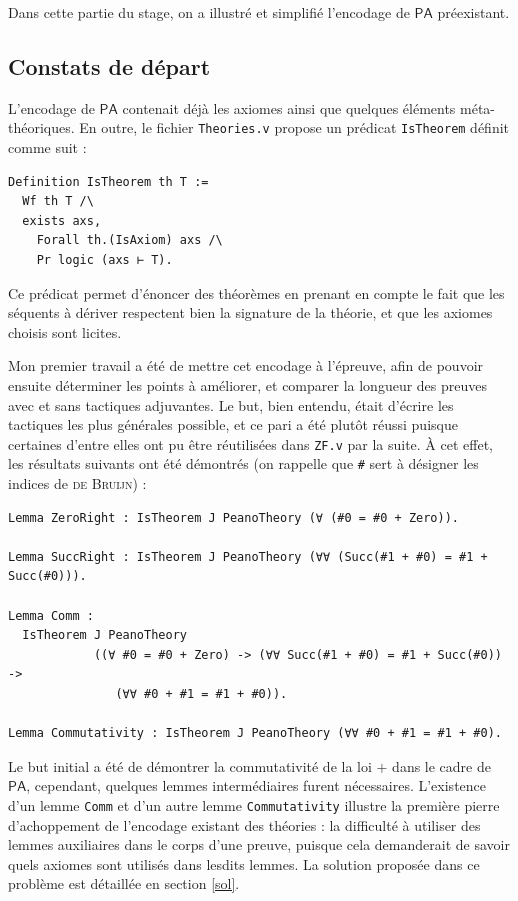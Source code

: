 \documentclass[a4paper]{article}
\newcommand{\PA}{\mathsf{PA}}
\theoremstyle{remark}
\theoremstyle{remark}
\theoremstyle{remark}
\theoremstyle{definition}
\theoremstyle{definition}
\theoremstyle{definition}
\begin{document}
Dans cette partie du stage, on a illustré et simplifié l'encodage de $\PA$ préexistant.

\subsection{Constats de départ}

L'encodage de $\PA$ contenait déjà les axiomes ainsi que quelques éléments méta-théoriques. En outre, le fichier \verb+Theories.v+ propose un prédicat \verb+IsTheorem+ définit comme suit :
\begin{verbatim}
Definition IsTheorem th T :=
  Wf th T /\
  exists axs,
    Forall th.(IsAxiom) axs /\
    Pr logic (axs ⊢ T).
\end{verbatim}
Ce prédicat permet d'énoncer des théorèmes en prenant en compte le fait que les séquents à dériver respectent bien la signature de la théorie, et que les axiomes choisis sont licites.

Mon premier travail a été de mettre cet encodage à l'épreuve, afin de pouvoir ensuite déterminer les points à améliorer, et comparer la longueur des preuves avec et sans tactiques adjuvantes. Le but, bien entendu, était d'écrire les tactiques les plus générales possible, et ce pari a été plutôt réussi puisque certaines d'entre elles ont pu être réutilisées dans \verb+ZF.v+ par la suite. \`A cet effet, les résultats suivants ont été démontrés (on rappelle que \verb+#+ sert à désigner les indices de \textsc{de Bruijn}) :
\begin{verbatim}
Lemma ZeroRight : IsTheorem J PeanoTheory (∀ (#0 = #0 + Zero)).

Lemma SuccRight : IsTheorem J PeanoTheory (∀∀ (Succ(#1 + #0) = #1 + Succ(#0))).

Lemma Comm :
  IsTheorem J PeanoTheory
            ((∀ #0 = #0 + Zero) -> (∀∀ Succ(#1 + #0) = #1 + Succ(#0)) ->
               (∀∀ #0 + #1 = #1 + #0)).

Lemma Commutativity : IsTheorem J PeanoTheory (∀∀ #0 + #1 = #1 + #0).
\end{verbatim}
Le but initial a été de démontrer la commutativité de la loi $+$ dans le cadre de $\PA$, cependant, quelques lemmes intermédiaires furent nécessaires. L'existence d'un lemme \verb+Comm+ et d'un autre lemme \verb+Commutativity+ illustre la première pierre d'achoppement de l'encodage existant des théories : la difficulté à utiliser des lemmes auxiliaires dans le corps d'une preuve, puisque cela demanderait de savoir quels axiomes sont utilisés dans lesdits lemmes. La solution proposée dans ce problème est détaillée en section \ref{sol}.
\end{document}
